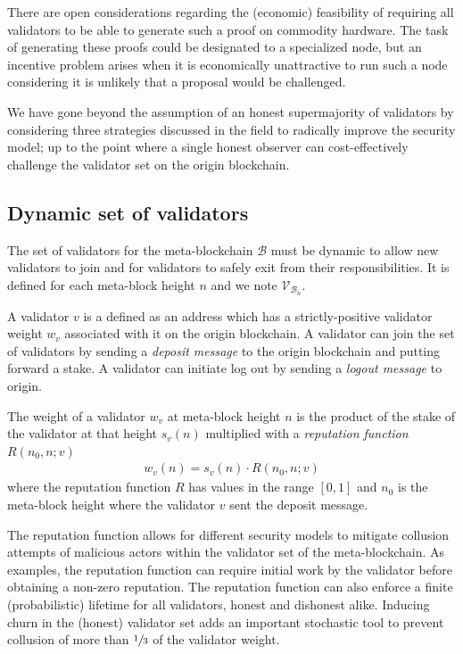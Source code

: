 \documentclass[12pt,a4paper]{article}
\begin{document}
There are open considerations regarding the (economic) feasibility of requiring all validators to be able to generate such a proof on commodity hardware.
The task of generating these proofs could be designated to a specialized node, but an incentive problem arises when it is economically unattractive to run such a node considering it is unlikely that a proposal would be challenged.

We have gone beyond the assumption of an honest supermajority of validators by considering three strategies discussed in the field to radically improve the security model; up to the point where a single honest observer can cost-effectively challenge the validator set on the origin blockchain.


\subsection{Dynamic set of validators}

The set of validators for the meta-blockchain $\mathcal{B}$ must be dynamic to allow new validators to join and for validators to safely exit from their responsibilities.
It is defined for each meta-block height $n$ and we note $\mathcal{V}_{\mathcal{B}_n}$.

A validator $v$ is a defined as an address which has a strictly-positive validator weight $w_v$ associated with it on the origin blockchain.
A validator can join the set of validators by sending a \emph{deposit message} to the origin blockchain and putting forward a stake.
A validator can initiate log out by sending a \emph{logout message} to origin.

The weight of a validator $w_v$ at meta-block height $n$ is the product of the stake of the validator at that height $s_v(n)$ multiplied with a \emph{reputation function} $R(n_0, n; v)$
\begin{align}
\label{validator_weights}
  w_v(n) = s_v(n) \cdot R(n_0, n; v)
\end{align}
where the reputation function $R$ has values in the range $[0,1]$ and $n_0$ is the meta-block height where the validator $v$ sent the deposit message.

The reputation function allows for different security models to mitigate collusion attempts of malicious actors within the validator set of the meta-blockchain.
As examples, the reputation function can require initial work by the validator before obtaining a non-zero reputation.
The reputation function can also enforce a finite (probabilistic) lifetime for all validators, honest and dishonest alike.
Inducing churn in the (honest) validator set adds an important stochastic tool to prevent collusion of more than $\sfrac{1}{3}$ of the validator weight.
\end{document}
